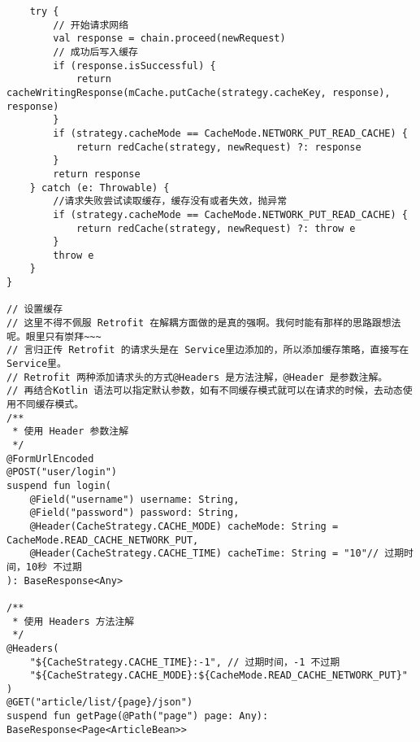 \documentclass[9pt, b5paper]{article}
\begin{document}
\begin{verbatim}
    try {
        // 开始请求网络
        val response = chain.proceed(newRequest)
        // 成功后写入缓存
        if (response.isSuccessful) {
            return cacheWritingResponse(mCache.putCache(strategy.cacheKey, response), response)
        }
        if (strategy.cacheMode == CacheMode.NETWORK_PUT_READ_CACHE) {
            return redCache(strategy, newRequest) ?: response
        }
        return response
    } catch (e: Throwable) {
        //请求失败尝试读取缓存，缓存没有或者失效，抛异常
        if (strategy.cacheMode == CacheMode.NETWORK_PUT_READ_CACHE) {
            return redCache(strategy, newRequest) ?: throw e
        }
        throw e
    }
}

// 设置缓存
// 这里不得不佩服 Retrofit 在解耦方面做的是真的强啊。我何时能有那样的思路跟想法呢。眼里只有崇拜~~~
// 言归正传 Retrofit 的请求头是在 Service里边添加的，所以添加缓存策略，直接写在Service里。
// Retrofit 两种添加请求头的方式@Headers 是方法注解，@Header 是参数注解。
// 再结合Kotlin 语法可以指定默认参数，如有不同缓存模式就可以在请求的时候，去动态使用不同缓存模式。
/**
 * 使用 Header 参数注解
 */
@FormUrlEncoded
@POST("user/login")
suspend fun login(
    @Field("username") username: String,
    @Field("password") password: String,
    @Header(CacheStrategy.CACHE_MODE) cacheMode: String = CacheMode.READ_CACHE_NETWORK_PUT,
    @Header(CacheStrategy.CACHE_TIME) cacheTime: String = "10"// 过期时间，10秒 不过期
): BaseResponse<Any>

/**
 * 使用 Headers 方法注解
 */
@Headers(
    "${CacheStrategy.CACHE_TIME}:-1", // 过期时间，-1 不过期
    "${CacheStrategy.CACHE_MODE}:${CacheMode.READ_CACHE_NETWORK_PUT}"
)
@GET("article/list/{page}/json")
suspend fun getPage(@Path("page") page: Any): BaseResponse<Page<ArticleBean>>


\end{verbatim}
\end{document}
